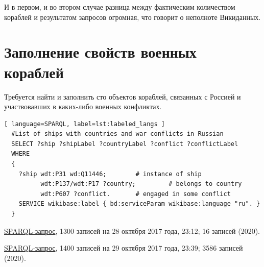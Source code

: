 И в первом, и во втором случае разница между фактическим количеством кораблей и результатом запросов огромная, что говорит о неполноте Викиданных.


\section{Заполнение свойств военных кораблей}

Требуется найти и заполнить сто объектов кораблей, связанных с Россией и участвовавших в каких-либо военных конфликтах.


\begin{lstlisting}[ language=SPARQL, label=lst:labeled_langs ]
  #List of ships with countries and war conflicts in Russian
  SELECT ?ship ?shipLabel ?countryLabel ?conflict ?conflictLabel
  WHERE
  {
    ?ship wdt:P31 wd:Q11446;        # instance of ship
          wdt:P137/wdt:P17 ?country;         # belongs to country
          wdt:P607 ?conflict.       # engaged in some conflict
    SERVICE wikibase:label { bd:serviceParam wikibase:language "ru". }
  }
\end{lstlisting}

\href{https://query.wikidata.org/#%23List%20of%20ship%20with%20countries%20and%20war%20conflicts%20in%20Russian%0ASELECT%20%3Fship%20%3FshipLabel%20%3FcountryLabel%20%3Fconflict%20%3FconflictLabel%0AWHERE%0A%7B%0A%20%20%3Fship%20wdt%3AP31%20wd%3AQ11446%3B%0A%20%20%20%20%20%20%20%20wdt%3AP17%20%3Fcountry%3B%20%20%20%20%20%20%20%20%20%23%20belongs%20to%20country%0A%20%20%20%20%20%20%20%20wdt%3AP607%20%3Fconflict.%20%20%20%20%20%20%20%23%20engaged%20in%20some%20conflict%0A%20%20SERVICE%20wikibase%3Alabel%20%7B%20bd%3AserviceParam%20wikibase%3Alanguage%20"ru".%20%7D%0A%7D}{SPARQL-запрос}, 1300 записей на 28 октября 2017 года, 23:12; 16 записей (2020).

\href{https://query.wikidata.org/#%23List%20of%20ships%20with%20countries%20and%20war%20conflicts%20in%20Russian%0ASELECT%20%3Fship%20%3FshipLabel%20%3FcountryLabel%20%3Fconflict%20%3FconflictLabel%0AWHERE%0A%7B%0A%20%20%3Fship%20wdt%3AP31%20wd%3AQ11446%3B%20%20%20%20%20%20%20%20%23%20instance%20of%20ship%0A%20%20%20%20%20%20%20%20wdt%3AP137%2Fwdt%3AP17%20%3Fcountry%3B%20%20%20%20%20%20%20%20%20%23%20belongs%20to%20country%0A%20%20%20%20%20%20%20%20wdt%3AP607%20%3Fconflict.%20%20%20%20%20%20%20%23%20engaged%20in%20some%20conflict%0A%20%20SERVICE%20wikibase%3Alabel%20%7B%20bd%3AserviceParam%20wikibase%3Alanguage%20"ru".%20%7D%0A%7D}{SPARQL-запрос}, 1400 записей на 29 октября 2017 года, 23:39; 3586 записей (2020).

